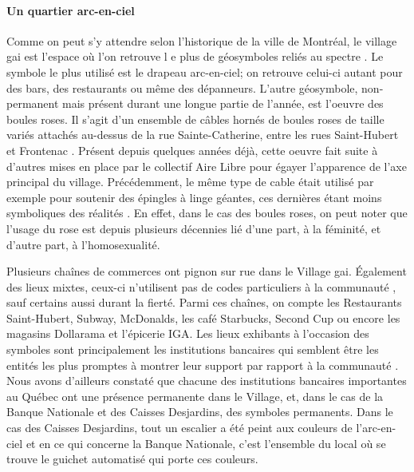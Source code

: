 \paragraph{Un quartier arc-en-ciel}
Comme on peut s'y attendre selon l'historique de la ville de Montréal, le village gai est l'espace où l'on retrouve l e plus de géosymboles reliés au spectre \lgbt{}.
Le symbole le plus utilisé est le drapeau arc-en-ciel; on retrouve celui-ci autant pour des bars, des restaurants ou même des dépanneurs.
L'autre géosymbole, non-permanent mais présent durant une longue partie de l'année, est l'oeuvre des boules roses.
Il s'agit d'un ensemble de câbles hornés de boules roses de taille variés attachés au-dessus de la rue Sainte-Catherine, entre les rues Saint-Hubert et Frontenac .
Présent depuis quelques années déjà, cette oeuvre fait suite à d'autres mises en place par le collectif Aire Libre pour égayer l'apparence de l'axe principal du village.
Précédemment, le même type de cable était utilisé par exemple pour soutenir des épingles à linge géantes, ces dernières étant moins symboliques des réalités \lgbt{}.
En effet, dans le cas des boules roses, on peut noter que l'usage du rose est depuis plusieurs décennies lié d'une part, à la féminité, et d'autre part, à l'homosexualité.

Plusieurs chaînes de commerces ont pignon sur rue dans le Village gai.
Également des lieux mixtes, ceux-ci n'utilisent pas de codes particuliers à la communauté \lgbt, sauf certains aussi durant la fierté.
Parmi ces chaînes, on compte les Restaurants Saint-Hubert, Subway, McDonalds, les café Starbucks, Second Cup ou encore les magasins Dollarama et l'épicerie IGA.
Les lieux exhibants à l'occasion des symboles sont principalement les institutions bancaires qui semblent être les entités les plus promptes à montrer leur support par rapport à la communauté \lgbt.
Nous avons d'ailleurs constaté que chacune des institutions bancaires importantes au Québec ont une présence permanente dans le Village, et, dans le cas de la Banque Nationale et des Caisses Desjardins, des symboles \lgbt{} permanents.
Dans le cas des Caisses Desjardins, tout un escalier a été peint aux couleurs de l'arc-en-ciel et en ce qui concerne la Banque Nationale, c'est l'ensemble du local où se trouve le guichet automatisé qui porte ces couleurs.

